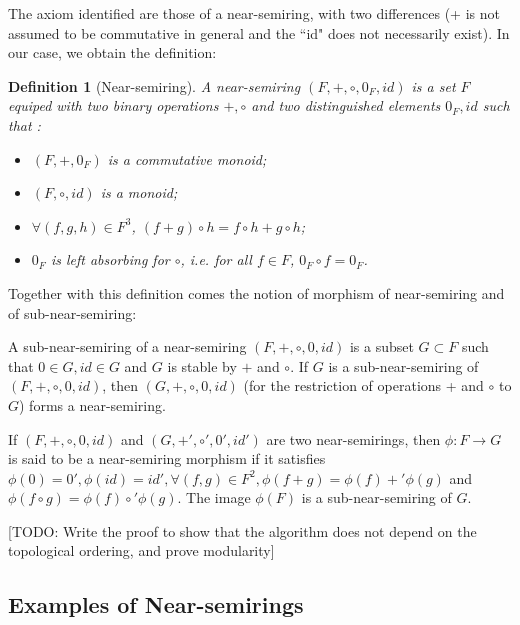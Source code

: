 \documentclass[11pt,a4paper]{article}
\newtheorem{definition}{Definition}
\theoremstyle{definition}
\begin{document}
The axiom identified are those of a near-semiring, with two differences (+ is not assumed to be commutative in general and the ``id" does not necessarily exist). In our case, we obtain the definition:

\begin{definition}[Near-semiring]

	A \textit{near-semiring} $(F,+,\circ,0_F,id)$ is a set $F$ equiped with two binary operations $+,\circ$ and two distinguished elements $0_F,id$ such that :
	
	\begin{itemize}

		\item $(F,+,0_F)$ is a commutative monoid;

		\item $(F,\circ,id)$ is a monoid;

		\item $\forall (f,g,h) \in F^3$, $(f+g) \circ h = f \circ h + g \circ h$;

		\item $0_F$ is left absorbing for $\circ$, i.e. for all $f \in F$, $0_F \circ f = 0_F$.

	\end{itemize}

\end{definition}

Together with this definition comes the notion of morphism of near-semiring and of sub-near-semiring:

A sub-near-semiring of a near-semiring $(F,+,\circ,0,id)$ is a subset $G \subset F$ such that $0 \in G, id \in G$ and $G$ is stable by $+$ and $\circ$. If $G$ is a sub-near-semiring of $(F,+,\circ,0,id)$, then $(G,+,\circ,0,id)$ (for the restriction of operations + and $\circ$ to $G$) forms a near-semiring.

If $(F,+,\circ,0,id)$ and $(G,+',\circ ',0',id')$ are two near-semirings, then $\phi : F \to G$ is said to be a near-semiring morphism if it satisfies $\phi(0)=0',\phi(id)=id',\forall (f,g) \in F^2, \phi(f+g) = \phi(f) +' \phi(g)$ and $ \phi(f \circ g)= \phi(f) \circ' \phi(g)$. The image $\phi(F)$ is a sub-near-semiring of $G$.

[TODO: Write the proof to show that the algorithm does not depend on the topological ordering, and prove modularity]

\subsection{Examples of Near-semirings}
\end{document}

